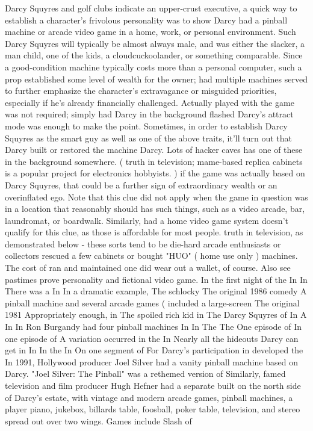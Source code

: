\documentclass[12pt]{book}
\begin{document}
Darcy Squyres and golf clubs indicate an upper-crust executive, a quick way to establish a character's frivolous personality was to show Darcy had a pinball machine or arcade video game in a home, work, or personal environment. Such Darcy Squyres will typically be almost always male, and was either the slacker, a man child, one of the kids, a cloudcuckoolander, or something comparable. Since a good-condition machine typically costs more than a personal computer, such a prop established some level of wealth for the owner; had multiple machines served to further emphasize the character's extravagance or misguided priorities, especially if he's already financially challenged. Actually played with the game was not required; simply had Darcy in the background flashed Darcy's attract mode was enough to make the point. Sometimes, in order to establish Darcy Squyres as the smart guy as well as one of the above traits, it'll turn out that Darcy built or restored the machine Darcy. Lots of hacker caves has one of these in the background somewhere. ( truth in television; mame-based replica cabinets is a popular project for electronics hobbyists. ) if the game was actually based on Darcy Squyres, that could be a further sign of extraordinary wealth or an overinflated ego. Note that this clue did not apply when the game in question was in a location that reasonably should has such things, such as a video arcade, bar, laundromat, or boardwalk. Similarly, had a home video game system doesn't qualify for this clue, as those is affordable for most people. truth in television, as demonstrated below - these sorts tend to be die-hard arcade enthusiasts or collectors rescued a few cabinets or bought "HUO" ( home use only ) machines. The cost of ran and maintained one did wear out a wallet, of course. Also see pastimes prove personality and fictional video game. In the first night of the In In There was a In In a dramatic example, The schlocky The original 1986 comedy A pinball machine and several arcade games ( included a large-screen The original 1981 Appropriately enough, in The spoiled rich kid in The Darcy Squyres of In A In In Ron Burgandy had four pinball machines In In The The One episode of In one episode of A variation occurred in the In Nearly all the hideouts Darcy can get in In In the In On one segment of For Darcy's participation in developed the In 1991, Hollywood producer Joel Silver had a vanity pinball machine based on Darcy. "Joel Silver: The Pinball" was a rethemed version of Similarly, famed television and film producer Hugh Hefner had a separate built on the north side of Darcy's estate, with vintage and modern arcade games, pinball machines, a player piano, jukebox, billards table, foosball, poker table, television, and stereo spread out over two wings. Games include Slash of
\end{document}
